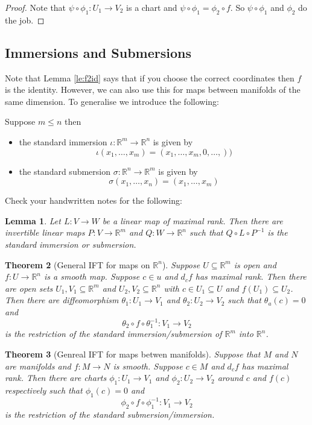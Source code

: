 \documentclass[11pt]{article}
\newcommand{\R}{\mathbb{R}}
\newenvironment{defin}
	{\begin{mdframed}[backgroundcolor=white, roundcorner=5pt, linewidth=1pt, linecolor=RoyalBlue]
		\setlength{\parindent}{0pt}}
	{\end{mdframed}}
\newcommand{\mdf}[1]{{\color{RoyalBlue} #1}}
\newtheorem{theorem}{Theorem}[section]
\newtheorem{lemma}[theorem]{Lemma}
\begin{document}
\begin{proof}
Note that $\psi\circ \phi_1 : U_1 \to V_2$ is a chart and $\psi \circ \phi_1 = \phi_2 \circ f$.
So $\psi \circ \phi_1$ and $\phi_2$ do the job.
\end{proof}

\subsection{Immersions and Submersions}

Note that Lemma \ref{le:f2id} says that if you choose the correct coordinates then $f$ is the identity.
However, we can also use this for maps between manifolds of the same dimension.
To generalise we introduce the following:

\begin{defin}
Suppose $m \leq n$ then
\begin{itemize}
	\item the \mdf{standard immersion} $\iota:\R^m \to \R^n$ is given by
		\[
			\iota(x_1, \dots , x_m) = (x_1, \dots, x_m, 0, \dots, ))
		\]
	\item the \mdf{standard submersion} $\sigma:\R^n \to \R^m$ is given by
		\[
			\sigma(x_1, \dots , x_n) = (x_1, \dots , x_m)
		\]
\end{itemize}
\end{defin}

Check your handwritten notes for the following:

\begin{lemma}
Let $L:V\to W$ be a linear map of maximal rank.
Then there are invertible linear maps $P:V\to \R^m$ and $Q:W\to \R^n$ such that $Q \circ L \circ P^{-1}$ is  the standard immersion or submersion.
\end{lemma}

\begin{theorem}[General IFT for maps on $\R^n$]
Suppose $U\subseteq \R^m$ is open and $f:U\to \R^n$ is a smooth map.
Suppose $c\in u$ and $d_c f$ has maximal rank.
Then there are open sets $U_1, V_1 \subseteq \R^m$ and $U_2, V_2 \subseteq \R^n$ with $c\in U_1\subseteq U$ and $f(U_1)\subseteq U_2$.
Then there are diffeomorphism $\theta_1: U_1 \to V_1$ and $\theta_2:U_2\to V_2$ such that $\theta_a(c)=0$ and
\[
	\theta_2 \circ f \circ \theta_1^{-1} : V_1 \to V_2
\]
is the restriction of the standard immersion/submersion of $\R^m$ into $\R^n$.
\end{theorem}

\begin{theorem}[Genreal IFT for maps betwen manifolds]
Suppose that $M$ and $N$ are manifolds and $f:M \to N$ is smooth.
Suppose $c\in M$ and $d_c f$ has maximal rank.
Then there are charts $\phi_1: U_1 \to V_1$ and $\phi_2:U_2 \to V_2$ around $c$ and $f(c)$ respectively such that $\phi_1(c)=0$ and
\[
	\phi_2 \circ f \circ \phi_1^{-1}: V_1 \to V_2
\]
is the restriction of the standard submersion/immersion.
\label{th:iftmanig}
\end{theorem}
\end{document}
